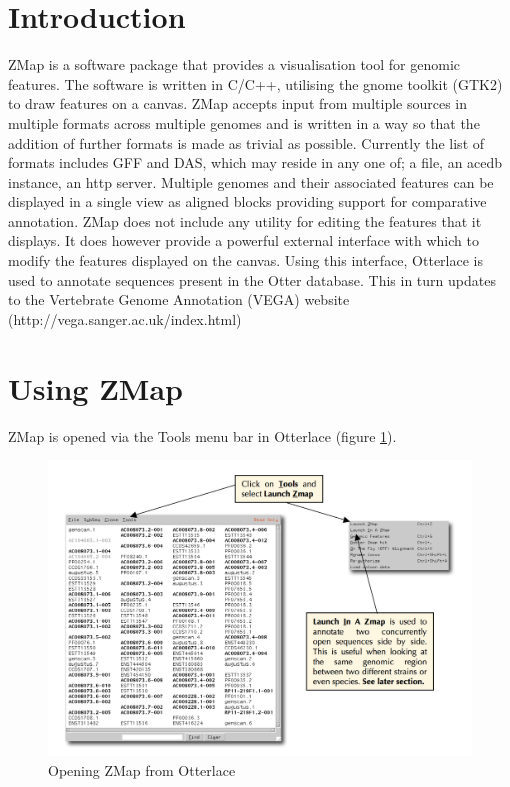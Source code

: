 \documentclass[letterpaper]{article}
\begin{document}
\clearpage\tableofcontents

\clearpage
\section{Introduction}

ZMap is a software package that provides a visualisation tool for genomic features. The software is written in C/C++, utilising the gnome toolkit (GTK2) to draw features on a canvas. ZMap accepts input from multiple sources in multiple formats across multiple genomes and is written in a way so that the addition of further formats is made as trivial as possible. Currently the list of formats includes GFF and DAS, which may reside in any one of; a file, an acedb instance, an http server. Multiple genomes and their associated features can be displayed in a single view as aligned blocks providing support for comparative annotation. ZMap does not include any utility for editing the features that it displays. It does however provide a powerful external interface with which to modify the features displayed on the canvas. Using this interface, Otterlace is used to annotate sequences present in the Otter database. This in turn updates to the Vertebrate Genome Annotation (VEGA) website (http://vega.sanger.ac.uk/index.html)

\section{Using ZMap}
ZMap is opened via the Tools menu bar in Otterlace (figure \ref{img_open_from_otterlace}).

\begin{figure}
\centering
\color[rgb]{0.30980393,0.5058824,0.7411765}
\includegraphics[width=15.231cm]{img_open_from_otterlace.png}
\caption{Opening ZMap from Otterlace}
\label{img_open_from_otterlace}
\end{figure}
\end{document}
